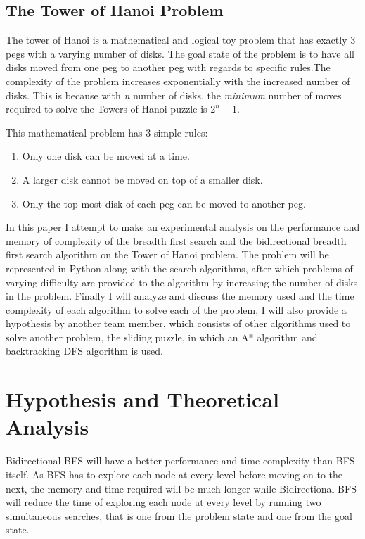 \documentclass[conference]{IEEEtran}
\begin{document}
\subsection{The Tower of Hanoi Problem}

The tower of Hanoi is a mathematical and logical toy problem that has exactly 3 pegs with a varying number of disks. The goal state of the problem is to have all disks moved from one peg to another peg with regards to specific rules.The complexity of the problem increases exponentially with the increased number of disks. This is because with \textit {n} number of disks, the \textit{minimum} number of moves required to solve the Towers of Hanoi puzzle is $2^{n} - 1$. \cite{FamousPuzzles}

This mathematical problem has 3 simple rules:

\begin{enumerate}
\item Only one disk can be moved at a time.
\item A larger disk cannot be moved on top of a smaller disk.
\item Only the top most disk of each peg can be moved to another peg. 
\end{enumerate}

In this paper I attempt to make an experimental analysis on the performance and memory of complexity of the breadth first search and the bidirectional breadth first search algorithm on the Tower of Hanoi problem. The problem will be represented in Python along with the search algorithms, after which problems of varying difficulty are provided to the algorithm by increasing the number of disks in the problem. Finally I will analyze and discuss the memory used and the time complexity of each algorithm to solve each of the problem, I will also provide a hypothesis by another team member, which consists of other algorithms used to solve another problem, the sliding puzzle, in which an A* algorithm and backtracking DFS algorithm is used. 

\section{Hypothesis and Theoretical Analysis}

Bidirectional BFS will have a better performance and time complexity than BFS itself. As BFS has to explore each node at every level before moving on to the next, the memory and time required will be much longer while Bidirectional BFS will reduce the time of exploring each node at every level by running two simultaneous searches, that is one from the problem state and one from the goal state. 
\end{document}
